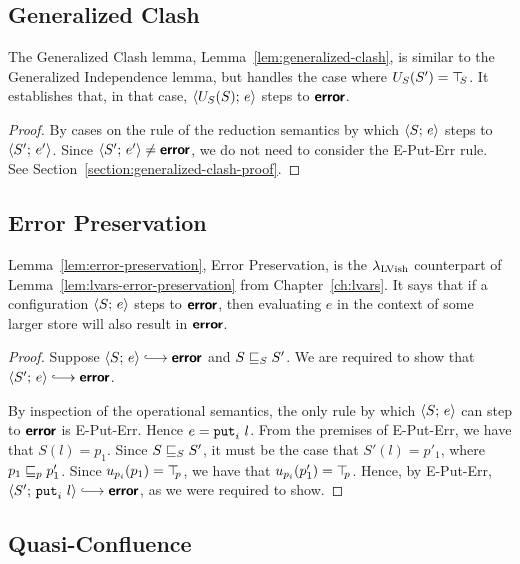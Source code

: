 \subsection{Generalized Clash}

The Generalized Clash lemma, Lemma~\ref{lem:generalized-clash}, is
similar to the Generalized Independence lemma, but handles the case
where $U_S(S') = \top\hspace{-0.85mm}_{S}$.  It establishes that, in that case,
$\langle U_S(S);\, e \rangle$ steps to $\textbf{\textsf{error}}$.

\LemGeneralizedClash
\begin{proof}
  By cases on the rule of the reduction semantics by which
  $\langle S;\, e \rangle$ steps to $\langle S';\, e' \rangle$.  Since $\langle S';\, e' \rangle
  \neq \textbf{\textsf{error}}$, we do not need to consider the {\sc E-Put-Err} rule.
  See Section~\ref{section:generalized-clash-proof}.
\end{proof}

\subsection{Error Preservation}

Lemma~\ref{lem:error-preservation}, Error Preservation, is the
$\lambda_{\textrm{LVish}}$ counterpart of Lemma~\ref{lem:lvars-error-preservation}
from Chapter~\ref{ch:lvars}.  It says that if a configuration
$\langle S;\, e \rangle$ steps to $\textbf{\textsf{error}}$, then evaluating $e$ in the context
of some larger store will also result in $\textbf{\textsf{error}}$.

\LemErrorPreservation
\begin{proof}
  Suppose $\config{S}{e} \parstepsto \error$ and
  $S \sqsubseteq_S S'$. We are required to show that $\config{S'}{e}
  \parstepsto \error$.

  By inspection of the operational semantics, the only rule by which
  $\langle S;\, e \rangle$ can step to $\textbf{\textsf{error}}$ is {\sc E-Put-Err}.  Hence $e =
  \mbox{\texttt{put}}_i~l$.  From the premises of {\sc E-Put-Err}, we have that
  $S(l) = p_1$.  Since $S \sqsubseteq_S S'$, it must be the case that
  $S'(l) = p'_1$, where $p_1 \sqsubseteq_p p'_1$.  Since $u_{p_i}(p_1) =
  \top\hspace{-0.85mm}_{p}$, we have that $u_{p_i}(p'_1) = \top\hspace{-0.85mm}_{p}$.  Hence, by {\sc
    E-Put-Err}, $\config{S'}{\putiexp{l}} \parstepsto \error$, as we
  were required to show.
\end{proof}

\subsection{Quasi-Confluence}\label{subsection:quasi-quasi-confluence}

